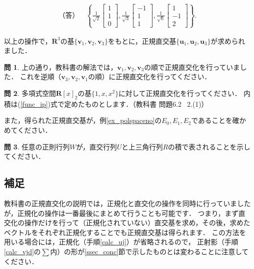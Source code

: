 \documentclass[dvipdfmx]{jsarticle}
\theoremstyle{definition}
\newtheorem{question}{問}[section]
\begin{document}
\begin{leftbar}
    \begin{align*}
        \text{（答）} \quad \left\{
        \frac{1}{\sqrt{2}} \begin{bmatrix} 1 \\ 1 \\ 0 \end{bmatrix} ,
        \frac{1}{\sqrt{3}} \begin{bmatrix} -1 \\ 1 \\ 1 \end{bmatrix} ,
        \frac{1}{\sqrt{6}} \begin{bmatrix} 1 \\ -1 \\ 2 \end{bmatrix}
        \right\} .
    \end{align*}
\end{leftbar}
以上の操作で，$\bm{R}^3$の基$\{ \bm{v}_1, \bm{v}_2, \bm{v}_3 \}$をもとに，正規直交基$\{ \bm{u}_1, \bm{u}_2, \bm{u}_3 \}$が求められました．


\begin{question}
    上の通り，教科書の解法では，$\bm{v}_1, \bm{v}_2, \bm{v}_3$の順で正規直交化を行っていました．
    これを逆順（$\bm{v}_3, \bm{v}_2, \bm{v}_1$の順）に正規直交化を行ってください．
\end{question}

\begin{question}
    多項式空間$\bm{R}[x]_2$の基$\{ 1, x, x^2 \}$に対して正規直交化を行ってください．
    内積は(\ref{func_ip})式で定めたものとします．（教科書 問題6.2 \ 2.(1)）

    また，得られた正規直交基が，例\ref{ex_polspaceno}の$E_0, E_1, E_2$であることを確かめてください．
\end{question}

\begin{question}
    任意の正則行列$W$が，直交行列$U$と上三角行列$R$の積で表されることを示してください．
\end{question}


\subsection{補足}
教科書の正規直交化の説明では，正規化と直交化の操作を同時に行っていましたが，正規化の操作は一番最後にまとめて行うことも可能です．
つまり，まず直交化の操作だけを行って（正規化されていない）直交基を求め，その後，求めたベクトルをそれぞれ正規化することでも正規直交基は得られます．
この方法を用いる場合には，正規化（手順\ref{calc_uj}）が省略されるので，
正射影（手順\ref{calc_vjd}の$\sum$内）の形が\ref{ssec_conc}節で示したものとは変わることに注意してください．
\end{document}
